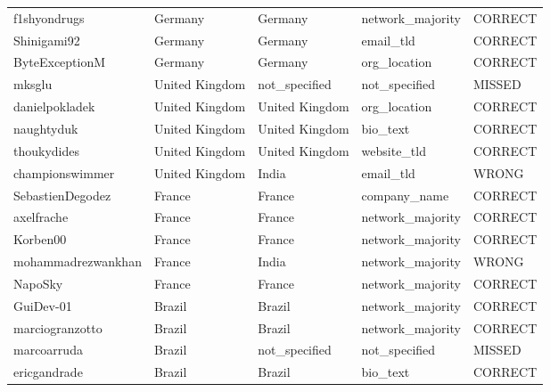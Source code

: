 \documentclass[11pt,a4paper]{article}
\begin{document}
\begin{longtable}{>{\ttfamily\small}p{4.4cm} p{3.0cm} p{3.0cm} p{2.6cm} p{1.6cm}}
\rowcolor{correct}  f1shyondrugs             & Germany        & Germany        & network\_majority & CORRECT \\
\rowcolor{correct}  Shinigami92              & Germany        & Germany        & email\_tld       & CORRECT \\
\rowcolor{correct}  ByteExceptionM           & Germany        & Germany        & org\_location    & CORRECT \\
\rowcolor{missed}   mksglu                   & United Kingdom & not\_specified & not\_specified   & MISSED  \\
\rowcolor{correct}  danielpokladek           & United Kingdom & United Kingdom & org\_location    & CORRECT \\
\rowcolor{correct}  naughtyduk               & United Kingdom & United Kingdom & bio\_text        & CORRECT \\
\rowcolor{correct}  thoukydides              & United Kingdom & United Kingdom & website\_tld     & CORRECT \\
\rowcolor{wrong}    championswimmer          & United Kingdom & India          & email\_tld       & WRONG   \\
\rowcolor{correct}  SebastienDegodez         & France         & France         & company\_name    & CORRECT \\
\rowcolor{correct}  axelfrache               & France         & France         & network\_majority & CORRECT \\
\rowcolor{correct}  Korben00                 & France         & France         & network\_majority & CORRECT \\
\rowcolor{wrong}    mohammadrezwankhan       & France         & India          & network\_majority & WRONG   \\
\rowcolor{correct}  NapoSky                  & France         & France         & network\_majority & CORRECT \\
\rowcolor{correct}  GuiDev-01                & Brazil         & Brazil         & network\_majority & CORRECT \\
\rowcolor{correct}  marciogranzotto          & Brazil         & Brazil         & network\_majority & CORRECT \\
\rowcolor{missed}   marcoarruda              & Brazil         & not\_specified & not\_specified   & MISSED  \\
\rowcolor{correct}  ericgandrade             & Brazil         & Brazil         & bio\_text        & CORRECT \\

\end{longtable}
\end{document}
